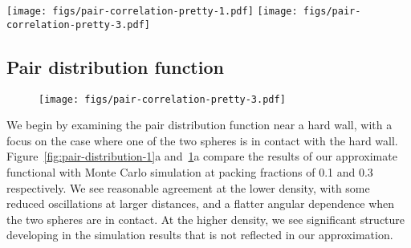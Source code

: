 \documentclass[letterpaper,twocolumn,amsmath,amssymb,pre,aps,10pt]{revtex4-1}
\newcommand{\red}[1]{{\bf \color{red} #1}}
\newcommand{\fixme}[1]{\red{[#1]}}
\begin{document}
\begin{figure*}
  \texttt{[image: figs/pair-correlation-pretty-1.pdf]}
  \texttt{[image: figs/pair-correlation-pretty-3.pdf]}
  \caption{  \fixme{Fix *ALL* plots to specify units of distance $x/R$.}
  }\label{fig:pair-distribution-1}
\end{figure*}

\subsection{Pair distribution function}

\begin{figure}
  \texttt{[image: figs/pair-correlation-pretty-3.pdf]}
  \caption{}\label{fig:pair-distribution-3}
\end{figure}

We begin by examining the pair distribution function near a hard wall,
with a focus on the case where one of the two spheres is in contact
with the hard wall.  Figure~\ref{fig:pair-distribution-1}a
and~\ref{fig:pair-distribution-3}a compare the results of our
approximate functional with Monte Carlo simulation at packing
fractions of 0.1 and 0.3 respectively.  We see reasonable agreement at
the lower density, with some reduced oscillations at larger distances,
and a flatter angular dependence when the two spheres are in contact.
At the higher density, we see significant structure developing in the
simulation results that is not reflected in our approximation.
\end{document}
